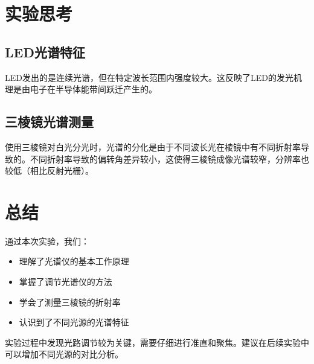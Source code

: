 \documentclass{ctexart}
\begin{document}
\section{实验思考}

\subsection{LED光谱特征}
LED发出的是连续光谱，但在特定波长范围内强度较大。这反映了LED的发光机理是由电子在半导体能带间跃迁产生的。

\subsection{三棱镜光谱测量}
使用三棱镜对白光分光时，光谱的分化是由于不同波长光在棱镜中有不同折射率导致的。不同折射率导致的偏转角差异较小，这使得三棱镜成像光谱较窄，分辨率也较低（相比反射光栅）。

\section{总结}

通过本次实验，我们：
\begin{itemize}
    \item 理解了光谱仪的基本工作原理
    \item 掌握了调节光谱仪的方法
    \item 学会了测量三棱镜的折射率
    \item 认识到了不同光源的光谱特征
\end{itemize}

实验过程中发现光路调节较为关键，需要仔细进行准直和聚焦。建议在后续实验中可以增加不同光源的对比分析。
\end{document}
